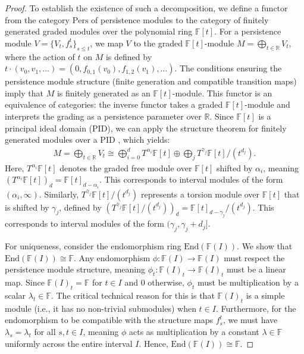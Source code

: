 \begin{proof}
To establish the existence of such a decomposition, we define a functor from the category $\mathrm{Pers}$ of persistence modules to the category of finitely generated graded modules over the polynomial ring $\mathbb{F}[t]$. For a persistence module $V = \{V_t, f_{s}^t\}_{s \leq t}$, we map $V$ to the graded $\mathbb{F}[t]$-module $M = \bigoplus_{t \in \mathbb{R}} V_t$, where the action of $t$ on $M$ is defined by $t \cdot (v_0, v_1, \ldots) = (0, f_{0,1}(v_0), f_{1,2}(v_1), \ldots)$. The conditions ensuring the persistence module structure (finite generation and compatible transition maps) imply that $M$ is finitely generated as an $\mathbb{F}[t]$-module. This functor is an equivalence of categories: the inverse functor takes a graded $\mathbb{F}[t]$-module and interprets the grading as a persistence parameter over $\mathbb{R}$. Since $\mathbb{F}[t]$ is a principal ideal domain (PID), we can apply the structure theorem for finitely generated modules over a PID \cite[\S 2.1]{zomorodian2004computing}, which yields:
\begin{align}
	M = \bigoplus_{t \in \mathbb{R}} V_t \cong \bigoplus_{i=0}^d T^{\alpha_i} \mathbb{F}[t] \oplus \bigoplus_j T^{\gamma_j} \mathbb{F}[t] / (t^{d_j}).
\end{align}
Here, \( T^{\alpha_i} \mathbb{F}[t] \) denotes the graded free module over \( \mathbb{F}[t] \) shifted by \( \alpha_i \), meaning \( (T^{\alpha_i} \mathbb{F}[t])_d = \mathbb{F}[t]_{d - \alpha_i} \). This corresponds to interval modules of the form \( (\alpha_i, \infty) \). Similarly, \( T^{\gamma_j} \mathbb{F}[t] / (t^{d_j}) \) represents a torsion module over \( \mathbb{F}[t] \) that is shifted by \( \gamma_j \), defined by \( (T^{\gamma_j} \mathbb{F}[t] / (t^{d_j}))_d = \mathbb{F}[t]_{d - \gamma_j} / (t^{d_j}) \). This corresponds to interval modules of the form \( (\gamma_j, \gamma_j + d_j] \). 

For uniqueness, consider the endomorphism ring $\text{End}(\mathbb{F}(I))$. We show that $\text{End}(\mathbb{F}(I)) \cong \mathbb{F}$. Any endomorphism $\phi: \mathbb{F}(I) \to \mathbb{F}(I)$ must respect the persistence module structure, meaning $\phi_t: \mathbb{F}(I)_t \to \mathbb{F}(I)_t$ must be a linear map. Since $\mathbb{F}(I)_t = \mathbb{F}$ for $t \in I$ and $0$ otherwise, $\phi_t$ must be multiplication by a scalar $\lambda_t \in \mathbb{F}$. The critical technical reason for this is that $\mathbb{F}(I)_t$ is a simple module (i.e., it has no non-trivial submodules) when $t \in I$. Furthermore, for the endomorphism to be compatible with the structure maps $f_{s}^t$, we must have $\lambda_s = \lambda_t$ for all $s, t \in I$, meaning $\phi$ acts as multiplication by a constant $\lambda \in \mathbb{F}$ uniformly across the entire interval $I$. Hence, $\text{End}(\mathbb{F}(I)) \cong \mathbb{F}$.


\end{proof}
